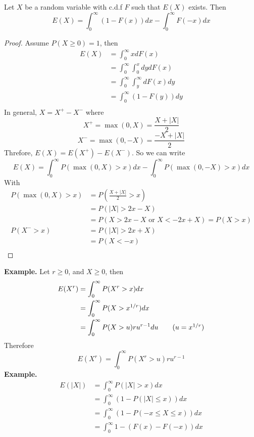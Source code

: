\documentclass[openany]{report}
\begin{document}
    \begin{theorem}
        Let $X$ be a random variable with c.d.f $F$ such that $E(X)$ exists. Then 
        \[E(X) = \int_0^\infty (1- F(x))dx - \int_0^\infty F(-x)dx\]
    \end{theorem}
    \begin{proof}
        Assume $P(X \geq 0) = 1$, then 
        \begin{align*}
            E(X) &= \int_0^\infty xdF(x)\\
            &= \int_0^\infty\int_0^x dydF(x)\\
            &= \int_0^\infty\int_y^\infty dF(x)dy\\
            &= \int_0^\infty (1-F(y))dy\\
        \end{align*}
        In general, $X = X^+ - X^-$ where 
        \[X^+ = \max(0,X) = \frac{X + |X|}{2}\]
        \[X^- = \max(0,-X) = \frac{-X + |X|}{2}\]
        Threfore, $E(X) = E(X^+) - E(X^-)$. So we can write 
        \[E(X) = \int_0^\infty P(\max(0,X) > x)dx - \int_0^\infty P(\max(0,-X) > x)dx\]
        With 
        \begin{align*}
            P(\max(0,X) > x) &= P\left(\frac{X+|X|}{2} > x\right)\\
            &= P(|X| > 2x - X)\\
            &= P(X > 2x - X \text{ or } X < -2x + X) = P(X > x)\\
            P(X^- > x) &= P(|X| > 2x + X)\\
            &= P(X < -x)\\
        \end{align*}
    \end{proof}
    \noindent
    \textbf{Example.} Let $r \geq 0$, and $X \geq 0$, then 
    \begin{align*}
        E(X^r) &= \int_0^\infty P(X^r > x)dx\\
        &= \int_0^\infty P(X > x^{1/r})dx\\
        &= \int_0^\infty P(X > u)ru^{r-1}du\tag{$u = x^{1/r}$}   
    \end{align*}
    Therefore 
    \[E(X^r) = \int_0^\infty P(X^r > u)ru^{r-1}\]
    \textbf{Example.} 
    \begin{align*}
        E(|X|) &= \int_0^\infty P(|X| > x)dx\\
        &= \int_0^\infty (1 - P(|X| \leq x))dx\\
        &= \int_0^\infty (1 - P( - x \leq X \leq x))dx\\
        &= \int_0^\infty 1 - (F(x) - F(-x))dx\\
    \end{align*}
\end{document}
